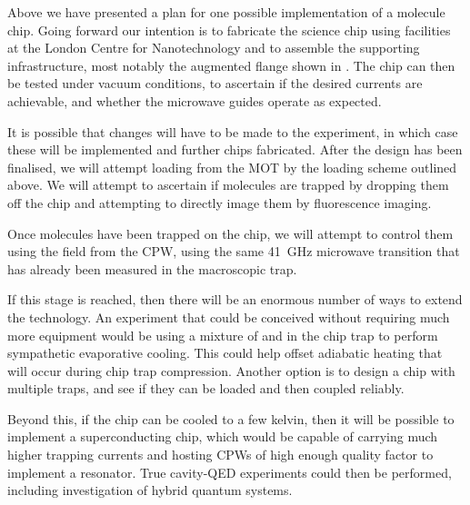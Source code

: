 Above we have presented a plan for one possible implementation of a molecule
chip. Going forward our intention is to fabricate the science chip using
facilities at the London Centre for Nanotechnology and to assemble the supporting
infrastructure, most notably the augmented flange shown in
. The chip can then be tested under vacuum
conditions, to ascertain if the desired currents are achievable, and whether
the microwave guides operate as expected. 

It is possible that changes will have to be made to the experiment, in which
case these will be implemented and further chips fabricated. After the design
has been finalised, we will attempt loading from the \CaF{} MOT by the loading
scheme outlined above. We will attempt to ascertain if molecules are trapped by
dropping them off the chip and attempting to directly image them by fluorescence
imaging.

Once molecules have been trapped on the chip, we will attempt to control them
using the field from the CPW, using the same \SI{41}{\giga\hertz} microwave
transition that has already been measured in the macroscopic trap.

If this stage is reached, then there will be an enormous number of ways to
extend the technology. An experiment that could be conceived without requiring
much more equipment would be using a mixture of \esRb{} and \CaF{} in the chip
trap to perform sympathetic evaporative cooling. This could help offset
adiabatic heating that will occur during chip trap compression. Another option
is to design a chip with multiple traps, and see if they can be loaded and then
coupled reliably.

Beyond this, if the chip can be cooled to a few kelvin, then it will be possible
to implement a superconducting chip, which would be capable of carrying much
higher trapping currents and hosting CPWs of high enough quality factor to
implement a resonator. True cavity-QED experiments could then be performed,
including investigation of hybrid quantum systems.
